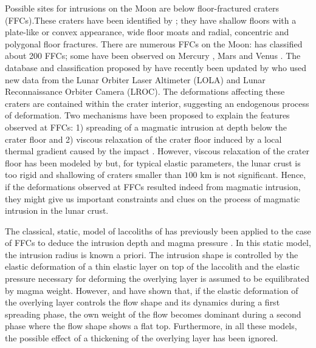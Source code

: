 \begin{article}
	
  Possible sites for intrusions on  the Moon are below floor-fractured
  craters    (FFCs).These   craters    have    been   identified    by
  \citet{Schultz1976}; they  have shallow floors with  a plate-like or
  convex  appearance,  wide floor  moats  and  radial, concentric  and
  polygonal  floor fractures.  There are  numerous FFCs  on the  Moon:
  \citet{Schultz1976} has  classified about  200 FFCs; some  have been
  observed       on        Mercury       \citep{Head2009a},       Mars
  \citep{Schultz1978,Schultz1979,Sato2010}          and          Venus
  \citep{Wichman1995a}.  The database  and classification  proposed by
  \citet{Schultz1976}     have     recently    been     updated     by
  \citet{Jozwiak2012} who used  new data from the  Lunar Orbiter Laser
  Altimeter (LOLA) and Lunar Reconnaissance Orbiter Camera (LROC). The
  deformations affecting these craters are contained within the crater
  interior,  suggesting  an  endogenous process  of  deformation.  Two
  mechanisms have  been proposed to  explain the features  observed at
  FFCs: 1) spreading of a magmatic intrusion at depth below the crater
  floor
  \citep{Schultz1976,Wichman1993,Wichman1995b,Wichman1996,Jozwiak2012}
  and 2)  viscous relaxation of  the crater  floor induced by  a local
  thermal gradient  caused by  the impact  \citep{Hall1981a}. However,
  viscous  relaxation  of  the  crater   floor  has  been  modeled  by
  \citet{Dombard2001} but,  for typical elastic parameters,  the lunar
  crust is too  rigid and shallowing of craters smaller  than $100$ km
  is  not significant.  Hence, if  the deformations  observed at  FFCs
  resulted  indeed  from  magmatic   intrusion,  they  might  give  us
  important constraints and clues on the process of magmatic intrusion
  in the lunar crust.
	
  The classical,  static, model of laccoliths  of \citet{Pollard1973a}
  has  previously been  applied  to the  case of  FFCs  to deduce  the
  intrusion          depth         and          magma         pressure
  \citep{Wichman1993,Wichman1996,Jozwiak2012}.  In this  static model,
  the  intrusion radius  is known  a  priori. The  intrusion shape  is
  controlled by the elastic deformation of a thin elastic layer on top
  of the  laccolith and the  elastic pressure necessary  for deforming
  the  overlying  layer  is  assumed   to  be  equilibrated  by  magma
  weight.  However,  \citet{Michaut2011} and  \citet{Bunger2011}  have
  shown  that,  if the  elastic  deformation  of the  overlying  layer
  controls the  flow shape and  its dynamics during a  first spreading
  phase, the own  weight of the flow becomes dominant  during a second
  phase where  the flow shape  shows a  flat top. Furthermore,  in all
  these models, the  possible effect of a thickening  of the overlying
  layer has been ignored.
	

\end{article}
